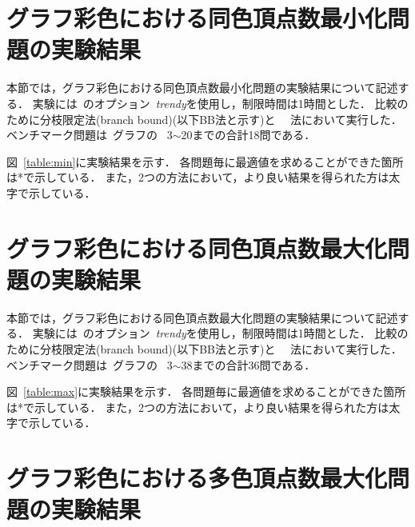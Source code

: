 \begin{table}[tb]
  \begin{minipage}[t]{0.45\linewidth}
    \centering
  \end{minipage}
  \begin{minipage}[t]{0.45\linewidth}
    \centering
  \end{minipage}
\end{table}

\section{グラフ彩色における同色頂点数最小化問題の実験結果}

本節では，グラフ彩色における同色頂点数最小化問題の実験結果について記述する．
実験には~{\clingo}のオプション~\textit{trendy}を使用し，制限時間は1時間とした．
比較のために分枝限定法(branch bound)(以下BB法と示す)と
~~法において実行した．
ベンチマーク問題は~グラフの
~3$\sim$20までの合計18問である．

図~\ref{table:min}に実験結果を示す．
各問題毎に最適値を求めることができた箇所は*で示している．
また，2つの方法において，より良い結果を得られた方は太字で示している．


\section{グラフ彩色における同色頂点数最大化問題の実験結果}

本節では，グラフ彩色における同色頂点数最大化問題の実験結果について記述する．
実験には~{\clingo}のオプション~\textit{trendy}を使用し，制限時間は1時間とした．
比較のために分枝限定法(branch bound)(以下BB法と示す)と
~~法において実行した．
ベンチマーク問題は~グラフの
~3$\sim$38までの合計36問である．

図~\ref{table:max}に実験結果を示す．
各問題毎に最適値を求めることができた箇所は*で示している．
また，2つの方法において，より良い結果を得られた方は太字で示している．

\section{グラフ彩色における多色頂点数最大化問題の実験結果}

